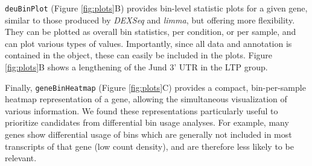 \documentclass{bmcart}
\begin{document}
\texttt{deuBinPlot} (Figure \ref{fig:plots}B) provides bin-level statistic plots for a given gene, similar to those produced by \textit{DEXSeq} and \textit{limma}, but offering more flexibility. They can be plotted as overall bin statistics, per condition, or per sample, and can plot various types of values. Importantly, since all data and annotation is contained in the object, these can easily be included in the plots. Figure \ref{fig:plots}B shows a lengthening of the Jund 3' UTR in the LTP group.

Finally, \texttt{geneBinHeatmap} (Figure \ref{fig:plots}C) provides a compact, bin-per-sample heatmap representation of a gene, allowing the simultaneous visualization of various information. We found these representations particularly useful to prioritize candidates from differential bin usage analyses. For example, many genes show differential usage of bins which are generally not included in most transcripts of that gene (low count density), and are therefore less likely to be relevant. 
\end{document}
